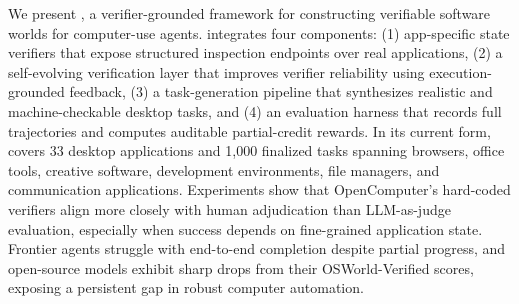 We present \textbf{\ours}, a verifier-grounded framework for constructing verifiable software worlds for computer-use agents. \ours integrates four components: 
(1) app-specific state verifiers that expose structured inspection endpoints over real applications, 
(2) a self-evolving verification layer that improves verifier reliability using execution-grounded feedback, 
(3) a task-generation pipeline that synthesizes realistic and machine-checkable desktop tasks, and 
(4) an evaluation harness that records full trajectories and computes auditable partial-credit rewards. In its current form, \ours covers 33 desktop applications and 1,000 finalized tasks spanning browsers, office tools, creative software, development environments, file managers, and communication applications. Experiments show that OpenComputer's hard-coded verifiers align more closely with
human adjudication than LLM-as-judge evaluation, especially when success depends on fine-grained application state. Frontier agents struggle with end-to-end completion despite partial progress, and open-source models exhibit sharp drops from their OSWorld-Verified scores, exposing a persistent gap in robust computer automation.

\vspace{-10pt}